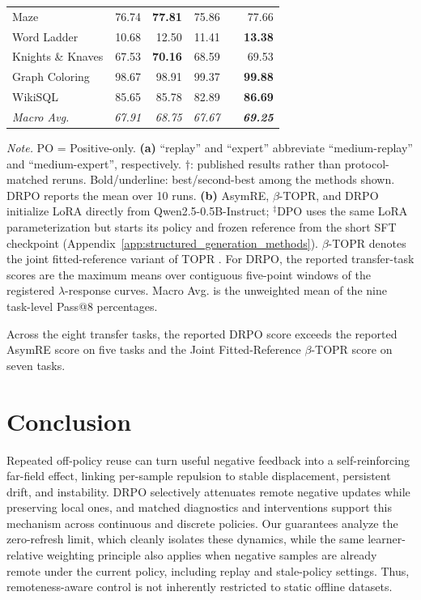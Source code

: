 \documentclass{article}
\theoremstyle{plain}
\theoremstyle{definition}
\theoremstyle{remark}
\begin{document}
\begin{table}[t]
\begin{minipage}[t]{0.515\textwidth}
{\begin{tabular}{@{}lrrrrr@{}}
Maze & 76.74 & \textbf{77.81} & 75.86 & & 77.66 \\
Word Ladder & 10.68 & 12.50 & 11.41 & & \textbf{13.38} \\
Knights \& Knaves & 67.53 & \textbf{70.16} & 68.59 & & 69.53 \\
Graph Coloring & 98.67 & 98.91 & 99.37 & & \textbf{99.88} \\
WikiSQL & 85.65 & 85.78 & 82.89 & & \textbf{86.69} \\
\midrule
\textit{Macro Avg.} & \textit{67.91} & \textit{68.75} & \textit{67.67} &
& \textbf{\textit{69.25}} \\
\bottomrule
\end{tabular}
}
\end{minipage}

\vspace{3pt}
\begin{minipage}{0.985\textwidth}
\scriptsize
\textit{Note.} PO = Positive-only.
\textbf{(a)} ``replay'' and ``expert'' abbreviate ``medium-replay'' and
``medium-expert'', respectively. $\dagger$: published results rather than
protocol-matched reruns. Bold/underline: best/second-best among the methods
shown. DRPO reports the mean over 10 runs.
\textbf{(b)} AsymRE, $\beta$-TOPR, and DRPO initialize LoRA directly from
Qwen2.5-0.5B-Instruct; $^{\ddagger}$DPO uses the same LoRA parameterization
but starts its policy and frozen reference from the short SFT checkpoint
(Appendix~\ref{app:structured_generation_methods}).
$\beta$-TOPR denotes the joint fitted-reference variant of TOPR
\citep{leroux2025tapered}.
For DRPO, the reported transfer-task scores are the maximum means over
contiguous five-point windows of the registered $\lambda$-response curves.
Macro Avg. is the unweighted mean of the nine task-level Pass@8 percentages.
\end{minipage}
\end{table}

Across the eight transfer tasks, the reported DRPO score exceeds the
reported AsymRE score on five tasks and the Joint Fitted-Reference
\(\beta\)-TOPR score on seven tasks.

\section{Conclusion}

Repeated off-policy reuse can turn useful negative feedback into a
self-reinforcing far-field effect, linking per-sample repulsion to stable
displacement, persistent drift, and instability. DRPO selectively attenuates
remote negative updates while preserving local ones, and matched diagnostics
and interventions support this mechanism across continuous and discrete
policies. Our guarantees analyze the zero-refresh limit, which cleanly isolates
these dynamics, while the same learner-relative weighting principle also
applies when negative samples are already remote under the current policy,
including replay and stale-policy settings. Thus, remoteness-aware control is
not inherently restricted to static offline datasets.
\end{document}
